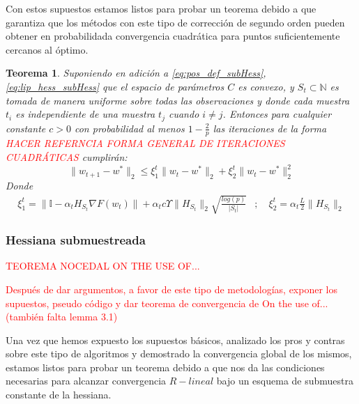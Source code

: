 \documentclass{book}
\theoremstyle{plain}
\newtheorem{thm}{Teorema}[section]
\theoremstyle{definition}
\theoremstyle{remark}
\begin{document}
Con estos supuestos estamos listos para probar un teorema debido a \cite{ERDOGDU} que garantiza que los métodos con este tipo de corrección de segundo orden pueden obtener en probabilidada convergencia cuadrática para puntos suficientemente cercanos al óptimo. 

\begin{thm}\label{thm:quad_conv}
Suponiendo en adición a \ref{eq:pos_def_subHess}, \ref{eq:lip_hess_subHess} que el espacio de parámetros $C$ es convexo, y $S_t\subset\mathbb{N}$ es tomada de manera uniforme sobre todas las observaciones y donde cada muestra $t_i$ es independiente de una muestra $t_j$ cuando $i\neq j$. Entonces para cualquier constante $c>0$ con probabilidad al menos $1-\frac{2}{p}$ las iteraciones de la forma \textcolor{red}{HACER REFERNCIA FORMA GENERAL DE ITERACIONES CUADRÁTICAS} cumplirán:
\begin{equation}
    \|w_{t+1} - w^*\|_2 \leq \xi_1^t\|w_{t} - w^*\|_2 + \xi_2^t\|w_t - w^*\|_2^2
\end{equation}
Donde
\begin{equation*}
\begin{split}
    \xi_1^t = \|\mathbb{I} - \alpha_t H_{S_t}\nabla F(w_t) \| + \alpha_t c \Upsilon\|H_{S_t}\|_2\sqrt{\frac{log(p)}{|S_t|}} &;\quad \xi_2^t = \alpha_t \frac{L}{2}\|H_{S_t}\|_2 
\end{split}
\end{equation*}
\end{thm}

\subsubsection{Hessiana submuestreada}

\textcolor{red}{TEOREMA NOCEDAL ON THE USE OF...}

\textcolor{red}{Después de dar argumentos, a favor de este tipo de metodologías, exponer los supuestos, pseudo código y dar teorema de convergencia de On the use of... (también falta lemma 3.1)}

Una vez que hemos expuesto los supuestos básicos, analizado los pros y contras sobre este tipo de algoritmos y demostrado la convergencia global de los mismos, estamos listos para probar un teorema debido a \cite{ROOSTA} que nos da las condiciones necesarias para alcanzar convergencia $R-lineal$ bajo un esquema de submuestra constante de la hessiana. 
\end{document}

